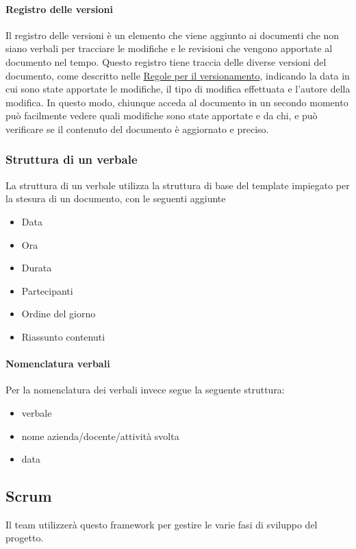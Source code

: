 \documentclass[12pt]{article}
\begin{document}
\paragraph{Registro delle versioni}
Il registro delle versioni è un elemento che viene aggiunto ai documenti che non siano verbali per tracciare le modifiche e le revisioni che vengono apportate al documento nel tempo. Questo registro tiene traccia delle diverse versioni del documento, come descritto nelle \hyperref[ver]{Regole per il versionamento}, indicando la data in cui sono state apportate le modifiche, il tipo di modifica effettuata e l'autore della modifica. In questo modo, chiunque acceda al documento in un secondo momento può facilmente vedere quali modifiche sono state apportate e da chi, e può verificare se il contenuto del documento è aggiornato e preciso.
\subsubsection{Struttura di un verbale}
La struttura di un verbale utilizza la struttura di base del template impiegato per la stesura di un documento, con le seguenti aggiunte
\begin{itemize}
    \item Data
    \item Ora
    \item Durata
    \item Partecipanti
    \item Ordine del giorno
    \item Riassunto contenuti
\end{itemize}
\paragraph{Nomenclatura verbali}
Per la nomenclatura dei verbali invece segue la seguente struttura:
\begin{itemize}
    \item verbale
    \item nome azienda/docente/attività svolta
    \item data
\end{itemize}

\subsection{Scrum}
Il team utilizzerà questo framework per gestire le varie fasi di sviluppo del progetto.
\end{document}
